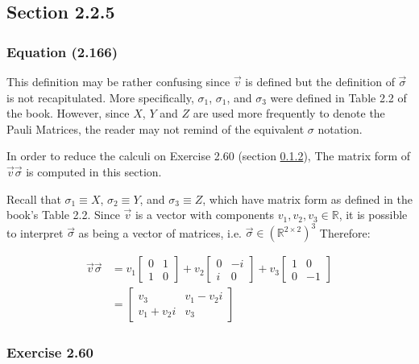 \subsection{Section 2.2.5}
\subsubsection{Equation (2.166)}

This definition may be rather confusing since $\vec{v}$ is defined
but the definition of $\vec{\sigma}$ is not recapitulated.
More specifically, $\sigma_1$, $\sigma_1$, and $\sigma_3$ were
defined in Table 2.2 of the book.
However, since $X$, $Y$ and $Z$ are used more frequently to
denote the Pauli Matrices, the reader may not remind of the
equivalent $\sigma$ notation.

In order to reduce the calculi on Exercise 2.60
(section \ref{sec:nielsen_and_chuang_exercise_2_60}),
The matrix form of $\vec{v} \vec{\sigma}$ is computed in this section.

Recall that $\sigma_1 \equiv X$, $\sigma_2 \equiv Y$,
and $\sigma_3 \equiv Z$, which have matrix form as defined in
the book's Table 2.2.
Since $\vec{v}$ is a vector with components
$v_1, v_2, v_3 \in \mathbb{R}$,
it is possible to interpret $\vec{\sigma}$ as being a vector of
matrices, i.e. $\vec{\sigma} \in (\mathbb{R}^{2 \times 2})^3$
Therefore:

\begin{align}
    \vec{v} \vec{\sigma} &= v_1 \left[ \begin{matrix}
        0 & 1 \\ 1 & 0 \end{matrix}\right] +
        v_2 \left[ \begin{matrix}
        0 & -i \\ i & 0 \end{matrix} \right] +
        v_3 \left[ \begin{matrix}
        1 & 0 \\ 0 & -1\end{matrix} \right]
        \\
        &= \left[ \begin{matrix}
        v_3 & v_1 -v_2 i \\ v_1 + v_2 i & v_3
        \end{matrix} \right]
\end{align}

\subsubsection{Exercise 2.60}
\label{sec:nielsen_and_chuang_exercise_2_60}
